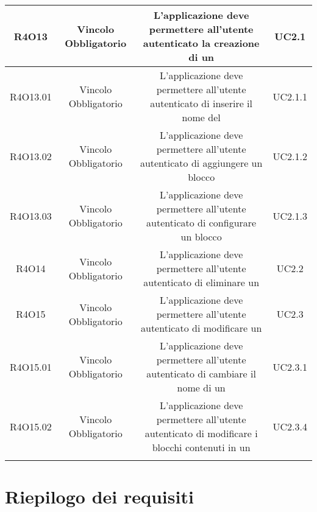 \begin{tabularx}{\textwidth}{|C|C|C|C|}
	\hline
	R4O13&Vincolo Obbligatorio&L'applicazione deve permettere all'utente autenticato la creazione di un&  UC2.1\\
	\hline
	R4O13.01&Vincolo Obbligatorio& L'applicazione deve permettere all'utente autenticato di inserire il nome del  & UC2.1.1\\
	\hline
	R4O13.02&Vincolo Obbligatorio&L'applicazione deve permettere all'utente autenticato di aggiungere un blocco &  UC2.1.2\\
	\hline	
	R4O13.03&Vincolo Obbligatorio&L'applicazione deve permettere all'utente autenticato di configurare un blocco&UC2.1.3\\
	\hline
	R4O14&Vincolo Obbligatorio&L'applicazione deve permettere all'utente autenticato di eliminare un&UC2.2\\
	\hline
	R4O15&Vincolo Obbligatorio& L'applicazione deve permettere all'utente autenticato di  modificare un  &UC2.3\\
	\hline
	R4O15.01&Vincolo Obbligatorio& L'applicazione deve permettere all'utente autenticato di cambiare il nome di un  &UC2.3.1\\
	\hline
	R4O15.02&Vincolo Obbligatorio& L'applicazione deve permettere all'utente autenticato di modificare i blocchi contenuti in un  &UC2.3.4\\
	\hline
	\caption{Tabella requisiti di vincolo}
\end{tabularx}

\section{Riepilogo dei requisiti}
\newpage
